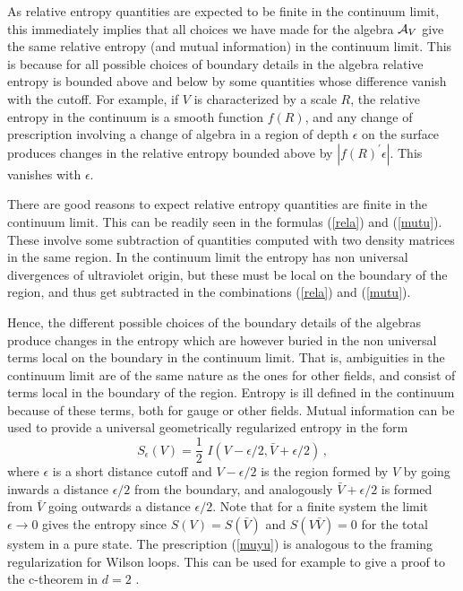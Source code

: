 \documentclass[12pt,a4paper]{article}
\newcommand{\be}{\begin{equation}}
\newcommand{\ee}{\end{equation}}
\def\be{\begin{equation}}
\def\ee{\end{equation}}
\begin{document}
As relative entropy quantities are expected to be finite in the continuum limit, this immediately implies 
that all choices we have made for the algebra ${\cal A}_V$ give the same relative 
entropy (and mutual information) in the continuum limit. This is because for all possible choices of boundary details in the algebra relative entropy  is bounded above and below by some quantities whose difference vanish with the cutoff. For example, if $V$ is characterized by a scale $R$, the relative entropy in the continuum is a smooth function $f(R)$, and any change of prescription involving a change of algebra in a region of depth $\epsilon$ on the surface produces changes in the relative entropy bounded above by $|f(R)^\prime \epsilon|$. This vanishes with $\epsilon$. 

There are good reasons to expect relative entropy quantities are finite in the continuum limit. This can be readily seen in the 
formulas (\ref{rela}) and (\ref{mutu}). These involve some subtraction of quantities computed with two density matrices in the same 
region. In the continuum limit the entropy has non universal divergences of ultraviolet origin, but these must be local on the 
boundary of the region, and thus get subtracted in the combinations (\ref{rela}) and (\ref{mutu}). 

Hence, the different possible choices of the boundary details of the algebras produce changes in the entropy which are however buried 
in the non universal terms local on the boundary in the continuum limit. That is, ambiguities in the continuum limit are of the 
same nature as the ones for other fields, and consist of terms local in the boundary of the region. 
Entropy is ill defined in the continuum because of 
these terms, both for gauge or other fields. 
Mutual information can be used to provide a universal geometrically regularized entropy in the form 
\be
S_\epsilon(V)=\frac{1}{2}\,\, I(V-\epsilon/2,\bar{V}+\epsilon/2)\,,\label{muyu}
\ee
 where $\epsilon$ is a short distance cutoff and $V- \epsilon/2$ is the region formed by $V$ by going inwards a distance $\epsilon/2$ from the boundary, and 
analogously $\bar{V}+\epsilon/2$ is formed from $\bar{V}$ going outwards a distance $\epsilon/2$. Note that for a finite system the limit 
$\epsilon\rightarrow 0$ gives the entropy since $S(V)=S(\bar{V})$ and $S(V\bar{V})=0$ for the total system in a pure state. The prescription (\ref{muyu}) is analogous to the framing regularization for Wilson loops. 
This can be used for example 
to give a proof to the c-theorem in $d=2$ \cite{mutualc}.
\end{document}
